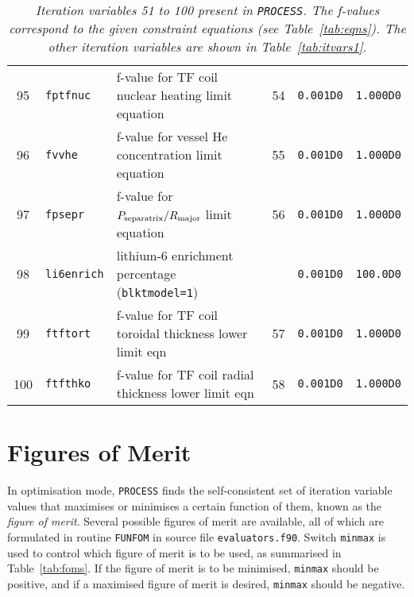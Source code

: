 \documentclass[11pt,a4paper]{report}
\newcommand{\process}{\mbox{\texttt{PROCESS}}}
\begin{document}
\begin{table}[tbph]
\begin{center}
\begin{tabular}{||c|l|l|c|c|c||}
95  & \texttt{fptfnuc}  & f-value for TF coil nuclear heating limit equation      & 54  & \texttt{0.001D0} & \texttt{1.000D0} \\
96  & \texttt{fvvhe}    & f-value for vessel He concentration limit equation      & 55  & \texttt{0.001D0} & \texttt{1.000D0} \\
97  & \texttt{fpsepr}   & f-value for $P_{\mbox{\scriptsize separatrix}}/R_{\mbox{\scriptsize major}}$ limit equation & 56
  & \texttt{0.001D0} & \texttt{1.000D0} \\
98  & \texttt{li6enrich}& lithium-6 enrichment percentage (\texttt{blktmodel=1})  &     & \texttt{0.001D0} & \texttt{100.0D0} \\
99  & \texttt{ftftort}  & f-value for TF coil toroidal thickness lower limit eqn  & 57  & \texttt{0.001D0} & \texttt{1.000D0} \\
100 & \texttt{ftfthko}  & f-value for TF coil radial thickness lower limit eqn    & 58  & \texttt{0.001D0} & \texttt{1.000D0} \\
\hline
\end{tabular}
\end{center}
\caption[List of iteration variables 51 to 100]
{\label{tab:itvars2}
  \textit{Iteration variables 51 to 100 present in \process. The f-values correspond to the
    given constraint equations (see Table~\ref{tab:eqns}). The other iteration
    variables are shown in Table~\ref{tab:itvars1}.}
}
\end{table}
\normalsize


\section{Figures of Merit}
\label{sec:foms}

In optimisation mode, \process\/ finds the self-consistent set of iteration
variable values that maximises or minimises a certain function of them, known
as the \textit{figure of merit}. Several possible figures of merit are
available, all of which are formulated in routine \texttt{FUNFOM} in source
file \texttt{evaluators.f90}.  Switch \texttt{minmax} is used to control which
figure of merit is to be used, as summarised in Table~\ref{tab:foms}. If the
figure of merit is to be minimised, \texttt{minmax} should be positive, and if
a maximised figure of merit is desired, \texttt{minmax} should be negative.

\end{document}
